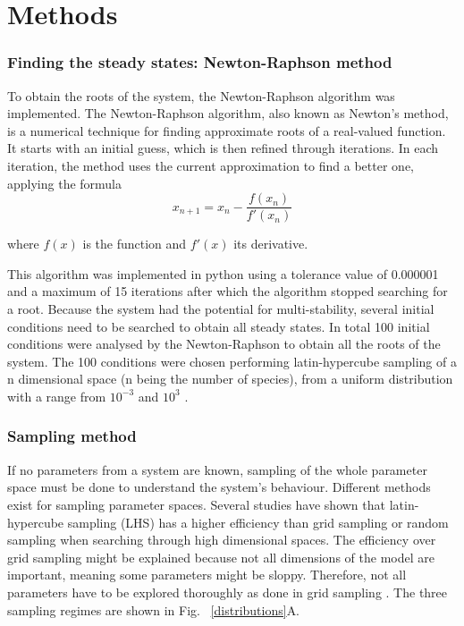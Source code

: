 \chapter{Methods}

\subsection{Finding the steady states: Newton-Raphson method}\label{newton_raphson}

To obtain the roots of the system, the Newton-Raphson algorithm was implemented.
The Newton-Raphson algorithm, also known as Newton's method, is a numerical technique for finding approximate roots of a real-valued function. It starts with an initial guess, which is then refined through iterations. In each iteration, the method uses the current approximation to find a better one, applying the formula
\begin{equation}
x_{n+1} = x_{n} - \frac{f(x_{n})}{f'(x_{n})}
\end{equation}

where $f(x)$ is the function and $f'(x)$ its derivative.

This algorithm was implemented in python using a tolerance value of 0.000001 and a maximum of 15 iterations after which the algorithm stopped searching for a root.
Because the system had the potential for multi-stability, several initial conditions need to be searched to obtain all steady states.
In total 100 initial conditions were analysed by the Newton-Raphson to obtain all the roots of the system.
The 100 conditions were chosen performing latin-hypercube sampling of a n dimensional space (n being the number of species), from a uniform distribution with a range from $10^{-3}$ and $10^3$ .
\subsection{Sampling method} \label{sampling method}
If no parameters from a system are known, sampling of the whole parameter space must be done to understand the system's behaviour.
Different methods exist for sampling parameter spaces.
Several studies have shown that latin-hypercube sampling (LHS) has a higher efficiency than grid sampling or random sampling when searching through high dimensional spaces.
The efficiency over grid sampling might be explained because not all dimensions of the model are important, meaning some parameters might be sloppy.
Therefore, not all parameters have to be explored thoroughly as done in grid sampling \parencite{Iman2014, Bergstra2012}.
The three sampling regimes are shown in Fig. ~\ref{distributions}A.

